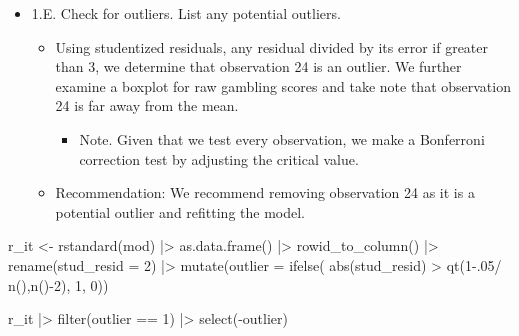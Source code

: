 \documentclass[
  letterpaper,
  DIV=11,
  numbers=noendperiod]{scrartcl}
\newenvironment{Shaded}{\begin{snugshade}}{\end{snugshade}}
\newcommand{\AttributeTok}[1]{\textcolor[rgb]{0.40,0.45,0.13}{#1}}
\newcommand{\DecValTok}[1]{\textcolor[rgb]{0.68,0.00,0.00}{#1}}
\newcommand{\FloatTok}[1]{\textcolor[rgb]{0.68,0.00,0.00}{#1}}
\newcommand{\FunctionTok}[1]{\textcolor[rgb]{0.28,0.35,0.67}{#1}}
\newcommand{\NormalTok}[1]{\textcolor[rgb]{0.00,0.23,0.31}{#1}}
\newcommand{\OtherTok}[1]{\textcolor[rgb]{0.00,0.23,0.31}{#1}}
\newcommand{\SpecialCharTok}[1]{\textcolor[rgb]{0.37,0.37,0.37}{#1}}
\providecommand{\tightlist}{%
  \setlength{\itemsep}{0pt}\setlength{\parskip}{0pt}}\usepackage{longtable,booktabs,array}
\begin{document}
\begin{itemize}
\item
  1.E. Check for outliers. List any potential outliers.

  \begin{itemize}
  \tightlist
  \item
    Using studentized residuals, any residual divided by its error if
    greater than 3, we determine that observation 24 is an outlier. We
    further examine a boxplot for raw gambling scores and take note that
    observation 24 is far away from the mean.

    \begin{itemize}
    \tightlist
    \item
      Note. Given that we test every observation, we make a Bonferroni
      correction test by adjusting the critical value.
    \end{itemize}
  \item
    Recommendation: We recommend removing observation 24 as it is a
    potential outlier and refitting the model.
  \end{itemize}
\end{itemize}

\begin{Shaded}
\begin{Highlighting}[]
\NormalTok{r\_it }\OtherTok{\textless{}{-}} \FunctionTok{rstandard}\NormalTok{(mod) }\SpecialCharTok{|\textgreater{}} 
  \FunctionTok{as.data.frame}\NormalTok{() }\SpecialCharTok{|\textgreater{}} 
  \FunctionTok{rowid\_to\_column}\NormalTok{() }\SpecialCharTok{|\textgreater{}} 
  \FunctionTok{rename}\NormalTok{(}\AttributeTok{stud\_resid =} \DecValTok{2}\NormalTok{) }\SpecialCharTok{|\textgreater{}} 
  \FunctionTok{mutate}\NormalTok{(}\AttributeTok{outlier =} \FunctionTok{ifelse}\NormalTok{(}
    \FunctionTok{abs}\NormalTok{(stud\_resid) }\SpecialCharTok{\textgreater{}} \FunctionTok{qt}\NormalTok{(}\DecValTok{1}\FloatTok{{-}.05}\SpecialCharTok{/} \FunctionTok{n}\NormalTok{(),}\FunctionTok{n}\NormalTok{()}\SpecialCharTok{{-}}\DecValTok{2}\NormalTok{), }\DecValTok{1}\NormalTok{, }\DecValTok{0}\NormalTok{))}

\NormalTok{r\_it }\SpecialCharTok{|\textgreater{}} \FunctionTok{filter}\NormalTok{(outlier }\SpecialCharTok{==} \DecValTok{1}\NormalTok{) }\SpecialCharTok{|\textgreater{}} \FunctionTok{select}\NormalTok{(}\SpecialCharTok{{-}}\NormalTok{outlier)}
\end{Highlighting}
\end{Shaded}
\end{document}
